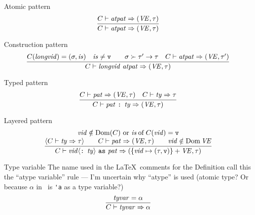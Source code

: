 
\begin{sml-rule}{Atomic pattern}
\begin{equation}\label{rule:static-core:atomic-pattern}
  \vcenter{\infer{\C\ts\atpat\ra (\VE,\tau)}
    {\C\ts\atpat\ra (\VE,\tau)}}
\end{equation}
\end{sml-rule}

\begin{sml-rule}{Construction pattern}
\begin{equation}\label{rule:static-core:construction-pattern}
  \vcenter{\infer{\C\ts\vidpat\ra (\VE,\tau)}
    {\C(\longvid) = (\sigma, \is)
      & \is\neq\isv\qquad \sigma\succ\tau'\to\tau
      & \C\ts\atpat\ra(\VE,\tau')}}
\end{equation}
\end{sml-rule}

\begin{sml-rule}{Typed pattern}
\begin{equation}\label{rule:static-core:typed-pattern}
  \vcenter{\infer{\C\ts\typedpat\ra (\VE,\tau)}
    {\C\ts\pat\ra(\VE,\tau)
      & \C\ts\ty\ra\tau}}
\end{equation}
\end{sml-rule}

\begin{sml-rule}{Layered pattern}
\begin{equation}\label{rule:static-core:layered-pattern}
  \vcenter{\infer{\C\ts\layeredvidpat\ra(\plusmap{\{\vid\mapsto(\tau,\isv)\}}{\VE},\tau)}
    {\deduce{\optional{\C\ts\ty\ra\tau}
        \qquad \C\ts\pat\ra(\VE,\tau)
      \qquad \vid\notin\Dom\VE
      }
      {\vid\notin\Dom(\C)\mbox{ or }\of{\is}{C(\vid)} = \isv}}}
\end{equation}
\end{sml-rule}


\begin{sml-rule}{Type variable}
The name used in the \LaTeX\ comments for the Definition call this
the ``atype variable'' rule --- I'm uncertain why ``atype'' is used
(atomic type? Or because $\alpha$ in \SML\ is \verb|'a| as a type variable?)
\begin{equation}\label{rule:static-core:type-variable}
  \vcenter{\infer{\C\ts\tyvar\ra\alpha}
    {\tyvar=\alpha}}
\end{equation}
\end{sml-rule}

